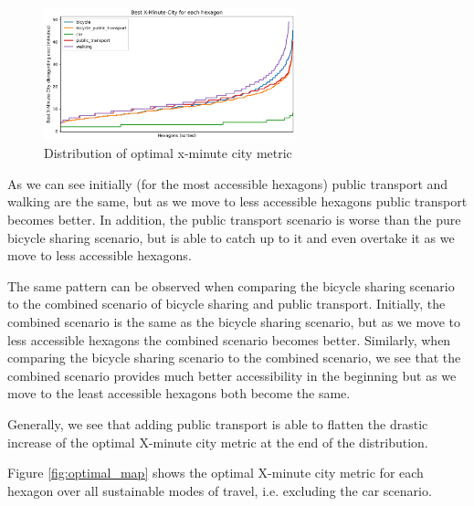 \begin{figure}
  \begin{center}
    \includegraphics[width=0.65\textwidth]{Figures/results/minute_city_metric/best_x_minute_city}
  \end{center}
  \caption{Distribution of optimal x-minute city metric}
  \label{fig:optimal_x_minute_city_metric}
\end{figure}

As we can see initially (for the most accessible hexagons) public transport and walking are the same, but as we move to less accessible hexagons public transport becomes better.
In addition, the public transport scenario is worse than the pure bicycle sharing scenario, but is able to catch up to it and even overtake it as we move to less accessible hexagons.

The same pattern can be observed when comparing the bicycle sharing scenario to the combined scenario of bicycle sharing and public transport.
Initially, the combined scenario is the same as the bicycle sharing scenario, but as we move to less accessible hexagons the combined scenario becomes better.
Similarly, when comparing the bicycle sharing scenario to the combined scenario, we see that the combined scenario provides much better accessibility in the beginning but as we move to the least accessible hexagons both become the same.

Generally, we see that adding public transport is able to flatten the drastic increase of the optimal X-minute city metric at the end of the distribution.


Figure \ref{fig:optimal_map} shows the optimal X-minute city metric for each hexagon over all sustainable modes of travel, i.e. excluding the car scenario.

